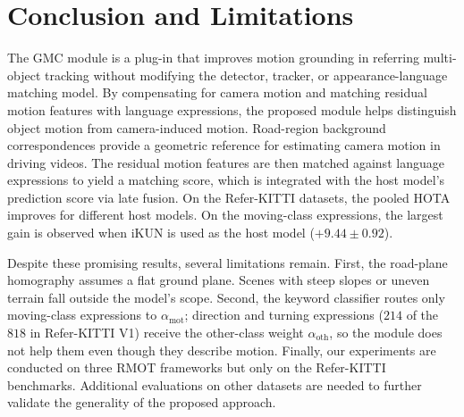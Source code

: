 \documentclass{article}
\begin{document}
\section{Conclusion and Limitations}
\label{sec:conclusion}
The GMC module is a plug-in that improves motion grounding in referring multi-object tracking without modifying the detector, tracker, or appearance-language matching model. By compensating for camera motion and matching residual motion features with language expressions, the proposed module helps distinguish object motion from camera-induced motion. Road-region background correspondences provide a geometric reference for estimating camera motion in driving videos. The residual motion features are then matched against language expressions to yield a matching score, which is integrated with the host model's prediction score via late fusion. On the Refer-KITTI datasets, the pooled HOTA improves for different host models. On the moving-class expressions, the largest gain is observed when iKUN is used as the host model ($+9.44\pm0.92$).

Despite these promising results, several limitations remain. First, the road-plane homography assumes a flat ground plane. Scenes with steep slopes or uneven terrain fall outside the model's scope. Second, the keyword classifier routes only moving-class expressions to $\alpha_{\mathrm{mot}}$; direction and turning expressions ($214$ of the $818$ in Refer-KITTI V1) receive the other-class weight $\alpha_{\mathrm{oth}}$, so the module does not help them even though they describe motion. Finally, our experiments are conducted on three RMOT frameworks but only on the Refer-KITTI benchmarks. Additional evaluations on other datasets are needed to further validate the generality of the proposed approach.



\end{document}
